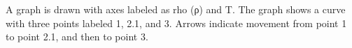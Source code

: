 A graph is drawn with axes labeled as rho (ρ) and T. The graph shows a curve with three points labeled 1, 2.1, and 3. Arrows indicate movement from point 1 to point 2.1, and then to point 3.